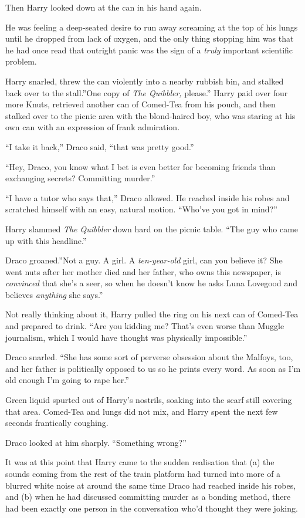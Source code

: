 Then Harry looked down at the can in his hand again.

He was feeling a deep-seated desire to run away screaming at the top of
his lungs until he dropped from lack of oxygen, and the only thing
stopping him was that he had once read that outright panic was the sign
of a \emph{truly} important scientific problem.

Harry snarled, threw the can violently into a nearby rubbish bin, and
stalked back over to the stall.''One copy of \emph{The Quibbler,}
please.'' Harry paid over four more Knuts, retrieved another can of
Comed-Tea from his pouch, and then stalked over to the picnic area with
the blond-haired boy, who was staring at his own can with an expression
of frank admiration.

``I take it back,'' Draco said, ``that was pretty good.''

``Hey, Draco, you know what I bet is even better for becoming friends
than exchanging secrets? Committing murder.''

``I have a tutor who says that,'' Draco allowed. He reached inside his
robes and scratched himself with an easy, natural motion. ``Who've you
got in mind?''

Harry slammed \emph{The Quibbler} down hard on the picnic table. ``The
guy who came up with this headline.''

Draco groaned.''Not a guy. A girl. A \emph{ten-year-old} girl, can you
believe it? She went nuts after her mother died and her father, who owns
this newspaper, is \emph{convinced} that she's a seer, so when he
doesn't know he asks Luna Lovegood and believes \emph{anything} she
says.''

Not really thinking about it, Harry pulled the ring on his next can of
Comed-Tea and prepared to drink. ``Are you kidding me? That's even worse
than Muggle journalism, which I would have thought was physically
impossible.''

Draco snarled. ``She has some sort of perverse obsession about the
Malfoys, too, and her father is politically opposed to us so he prints
every word. As soon as I'm old enough I'm going to rape her.''

Green liquid spurted out of Harry's nostrils, soaking into the scarf
still covering that area. Comed-Tea and lungs did not mix, and Harry
spent the next few seconds frantically coughing.

Draco looked at him sharply. ``Something wrong?''

It was at this point that Harry came to the sudden realisation that (a)
the sounds coming from the rest of the train platform had turned into
more of a blurred white noise at around the same time Draco had reached
inside his robes, and (b) when he had discussed committing murder as a
bonding method, there had been exactly one person in the conversation
who'd thought they were joking.

